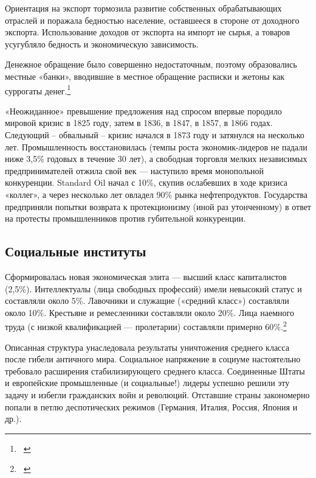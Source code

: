 \documentclass[a4paper]{article}
\begin{document}
{
Ориентация на экспорт тормозила развитие собственных обрабатывающих отраслей и поражала бедностью население, оставшееся
в стороне от доходного экспорта. Использование доходов от экспорта на импорт не сырья, а товаров усугубляло бедность и
экономическую зависимость.}

{
Денежное обращение было совершенно недостаточным, поэтому образовались местные «банки», вводившие в местное обращение
расписки и жетоны как суррогаты денег.\footnote{\ }}

{
«Неожиданное» превышение предложения над спросом впервые породило мировой кризис в 1825 году, затем в 1836, в 1847, в
1857, в 1866 годах. Следующий – обвальный – кризис начался в 1873 году и затянулся на несколько лет. Промышленность
восстановилась (темпы роста экономик-лидеров не падали ниже 3,5\% годовых в течение 30 лет), а свободная торговля
мелких независимых предпринимателей отжила свой век — наступило время монопольной конкуренции.
\foreignlanguage{english}{Standard} \foreignlanguage{english}{Oil} начал с 10\%, скупив ослабевших в ходе кризиса
«коллег», а через несколько лет овладел 90\% рынка нефтепродуктов. Государства предприняли попытки возврата к
протекционизму (иной раз утонченному) в ответ на протесты промышленников против губительной конкуренции.}

\subsection[Социальные институты ]{\rmfamily Социальные институты }
{
Сформировалась новая экономическая элита — высший класс капиталистов (2,5\%). Интеллектуалы (лица свободных профессий)
имели невысокий статус и составляли около 5\%. Лавочники и служащие («средний класс») составляли около 10\%. Крестьяне
и ремесленники составляли около 20\%. Лица наемного труда (с низкой квалификацией — пролетарии) составляли примерно
60\%.\footnote{\ } }

{
Описанная структура унаследовала результаты уничтожения среднего класса после гибели античного мира. Социальное
напряжение в социуме настоятельно требовало расширения стабилизирующего среднего класса. Соединенные Штаты и
европейские промышленные (и социальные!) лидеры успешно решили эту задачу и избегли гражданских войн и революций.
Отставшие страны закономерно попали в петлю деспотических режимов (Германия, Италия, Россия, Япония и др.). }
\end{document}
